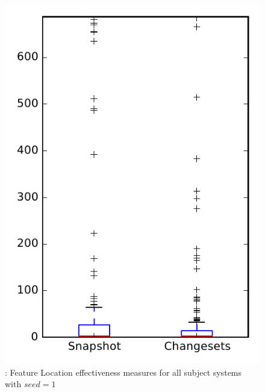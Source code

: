 
\begin{figure}
\centering
\includegraphics[height=0.4\textheight]{figures/flt_seed/rq1_overview_1}
\caption{\rone: Feature Location effectiveness measures for all subject systems with $seed=1$}
\label{fig:flt_seed:rq1:overview}
\end{figure}
